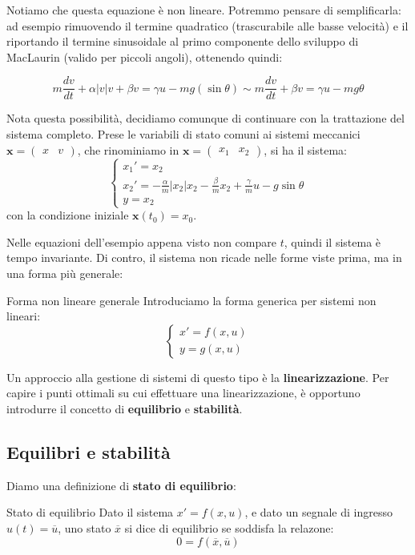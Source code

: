 \documentclass[a4paper,11pt]{article}
\begin{document}
Notiamo che questa equazione è non lineare.
Potremmo pensare di semplificarla: ad esempio rimuovendo il termine quadratico (trascurabile alle basse velocità) e il riportando il termine sinusoidale al primo componente dello sviluppo di MacLaurin (valido per piccoli angoli), ottenendo quindi:

$$
m \frac{dv}{dt} + \alpha |v|v + \beta v = \gamma u - m g (\sin{\theta}) \sim m \frac{dv}{dt} + \beta v = \gamma u - mg\theta
$$

Nota questa possibilità, decidiamo comunque di continuare con la trattazione del sistema completo.
Prese le variabili di stato comuni ai sistemi meccanici $\mathbf{x} = \begin{pmatrix}x & v \end{pmatrix}$, che rinominiamo in $\mathbf{x} = \begin{pmatrix} x_1 & x_2 \end{pmatrix}$, si ha il sistema:
\[
	\begin{cases}
		x_1' = x_2 \\
		x_2' = -\frac{\alpha}{m} |x_2| x_2 - \frac{\beta}{m} x_2 + \frac{\gamma}{m} u - g \sin{\theta} \\ 
		y = x_2
	\end{cases}
\]
con la condizione iniziale $\mathbf{x}(t_0) = x_0$.

\par\smallskip

Nelle equazioni dell'esempio appena visto non compare $t$, quindi il sistema è tempo invariante. 
Di contro, il sistema non ricade nelle forme viste prima, ma in una forma più generale:
\begin{definition}{Forma non lineare generale}
Introduciamo la forma generica per sistemi non lineari:
\[
	\begin{cases}
		x' = f(x, u) \\
		y = g(x, u)
	\end{cases}
\]
\end{definition}

Un approccio alla gestione di sistemi di questo tipo è la \textbf{linearizzazione}.
Per capire i punti ottimali su cui effettuare una linearizzazione, è opportuno introdurre il concetto di \textbf{equilibrio} e \textbf{stabilità}.

\subsection{Equilibri e stabilità}
Diamo una definizione di \textbf{stato di equilibrio}:
\begin{definition}{Stato di equilibrio}
	Dato il sistema $x' = f(x, u)$, e dato un segnale di ingresso $u(t) = \overline{u}$, uno stato $\overline{x}$ si dice di equilibrio se soddisfa la relazone:
	$$
	0 = f(\overline{x}, \overline{u})
	$$
\end{definition}
\end{document}
